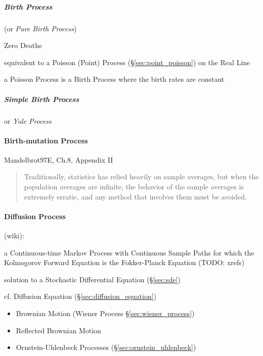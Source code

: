 \subparagraph{Birth Process}\label{sec:birth_process}\hfill

(or \emph{Pure Birth Process})

Zero Deaths

equivalent to a Poisson (Point) Process (\S\ref{sec:point_poisson}) on the Real
Line

a Poisson Process is a Birth Process where the birth rates are constant



\subparagraph{Simple Birth Process}\label{sec:simple_birth_process}\hfill

or \emph{Yule Process}



\paragraph{Birth-mutation Process}\label{sec:birth_mutation}\hfill

Mandelbrot97E, Ch.8, Appendix II

\begin{quote}
  Traditionally, statistics has relied heavily on sample averages, but when the
  population averages are infinite, the behavior of the sample averages is
  extremely erratic, and any method that involves them must be avoided.
\end{quote}



\paragraph{Diffusion Process}\label{sec:diffusion_process}\hfill

(wiki):

a Continuous-time Markov Process with Continuous Sample Paths for which the
Kolmogorov Forward Equation is the Fokker-Planck Equation (TODO: xrefs)

solution to a Stochastic Differential Equation (\S\ref{sec:sde})

cf. Diffusion Equation (\S\ref{sec:diffusion_equation})

\begin{itemize}
  \item Brownian Motion (Wiener Process \S\ref{sec:wiener_process})
  \item Reflected Brownian Motion
  \item Ornstein-Uhlenbeck Processes (\S\ref{sec:ornstein_uhlenbeck})
\end{itemize}

